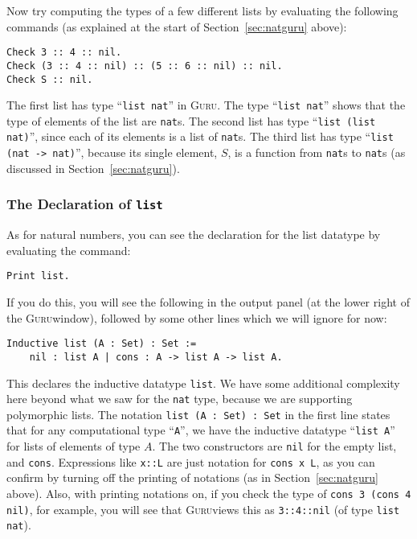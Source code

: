 \documentclass{book}[12pt]
\newcommand{\guru}[0]{\textsc{Guru}}
\begin{document}
\noindent Now try computing the types of a few different lists by
evaluating the following commands (as explained at the start of
Section~\ref{sec:natguru} above):

\begin{verbatim}
Check 3 :: 4 :: nil.
Check (3 :: 4 :: nil) :: (5 :: 6 :: nil) :: nil.
Check S :: nil.
\end{verbatim}

\noindent The first list has type ``\texttt{list nat}'' in \guru.  The
type ``\texttt{list nat}'' shows that the type of elements of the list
are \texttt{nat}s.  The second list has type ``\texttt{list (list
nat)}'', since each of its elements is a list of \texttt{nat}s.  The
third list has type ``\texttt{list (nat -> nat)}'', because its single
element, $S$, is a function from \texttt{nat}s to \texttt{nat}s (as
discussed in Section~\ref{sec:natguru}).

\subsubsection{The Declaration of \texttt{list}}

As for natural numbers, you can see the declaration for the list
datatype by evaluating the command:

\begin{verbatim}
Print list.
\end{verbatim}

\noindent If you do this, you will see the following in the output
panel (at the lower right of the \guru window), followed by some
other lines which we will ignore for now:

\begin{verbatim}
Inductive list (A : Set) : Set :=
    nil : list A | cons : A -> list A -> list A.
\end{verbatim}

\noindent This declares the inductive datatype \texttt{list}.  We have
some additional complexity here beyond what we saw for the
\texttt{nat} type, because we are supporting polymorphic lists.  The
notation \texttt{list (A : Set) : Set} in the first line states that
for any computational type ``\texttt{A}'', we have the inductive
datatype ``\texttt{list A}'' for lists of elements of type $A$.  The
two constructors are \texttt{nil} for the empty list, and
\texttt{cons}.  Expressions like \texttt{x::L} are just notation for
\texttt{cons x L}, as you can confirm by turning off the printing of
notations (as in Section~\ref{sec:natguru} above).  Also, with printing
notations on, if you check the type of \texttt{cons 3 (cons 4 nil)}, for
example, you will see that \guru views this as \texttt{3::4::nil} (of
type \texttt{list nat}).
\end{document}
